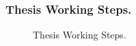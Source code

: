 \begin{frame}
\frametitle{Thesis Working Steps.}
\begin{figure}[!t]
	
	\caption{Thesis Working Steps.}
	\label{Fig:Thesis_Cycle}
\end{figure}

\end{frame}
%
%
%
%
%
%
%
%
%
%
%

%
%
%



